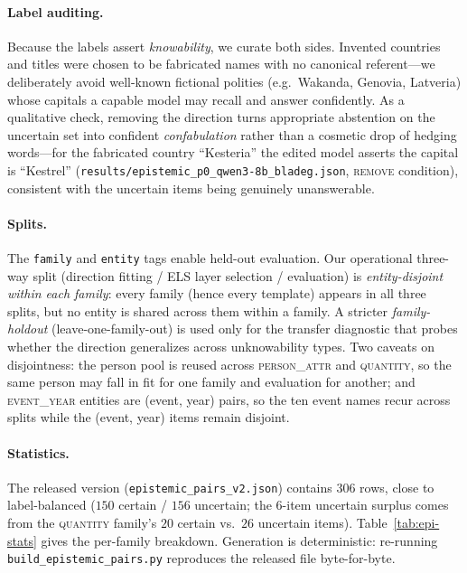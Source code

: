 \paragraph{Label auditing.}
Because the labels assert \emph{knowability}, we curate both sides. Invented countries and
titles were chosen to be fabricated names with no canonical referent---we deliberately
avoid well-known fictional polities (e.g.\ Wakanda, Genovia, Latveria) whose capitals a
capable model may recall and answer confidently. As a qualitative check, removing the
direction turns appropriate abstention on the uncertain set into confident
\emph{confabulation} rather than a cosmetic drop of hedging words---for the fabricated
country ``Kesteria'' the edited model asserts the capital is ``Kestrel''
(\texttt{results/epistemic\_p0\_qwen3-8b\_bladeg.json}, \textsc{remove} condition),
consistent with the uncertain items being genuinely unanswerable.

\paragraph{Splits.}
The \texttt{family} and \texttt{entity} tags enable held-out evaluation. Our operational
three-way split (direction fitting / ELS layer selection / evaluation) is
\emph{entity-disjoint within each family}: every family (hence every template) appears in
all three splits, but no entity is shared across them within a family. A stricter
\emph{family-holdout} (leave-one-family-out) is used only for the transfer diagnostic that
probes whether the direction generalizes across unknowability types. Two caveats on
disjointness: the person pool is reused across \textsc{person\_attr} and \textsc{quantity},
so the same person may fall in fit for one family and evaluation for another; and
\textsc{event\_year} entities are (event, year) pairs, so the ten event names recur across
splits while the (event, year) items remain disjoint.

\paragraph{Statistics.}
The released version (\texttt{epistemic\_pairs\_v2.json}) contains $306$ rows, close to
label-balanced ($150$ certain / $156$ uncertain; the $6$-item uncertain surplus comes from
the \textsc{quantity} family's $20$ certain vs.\ $26$ uncertain items).
Table~\ref{tab:epi-stats} gives the per-family breakdown. Generation is deterministic:
re-running \texttt{build\_epistemic\_pairs.py} reproduces the released file byte-for-byte.


